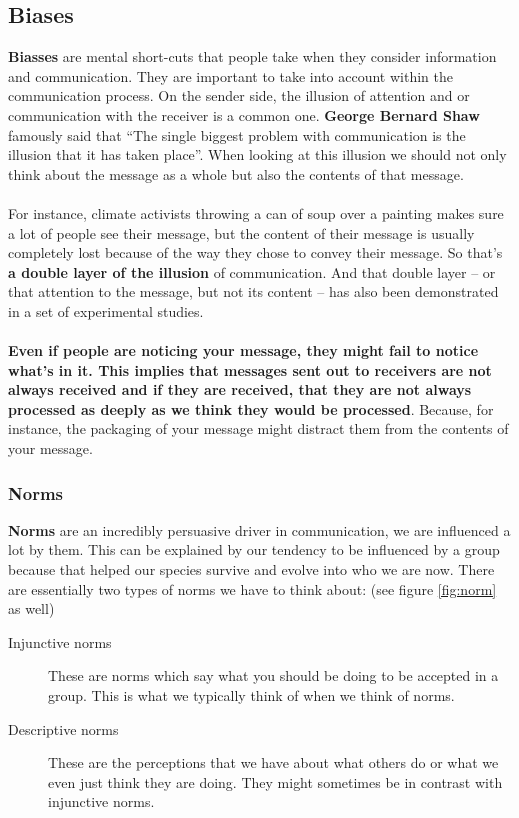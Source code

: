 \documentclass[../summary.tex]{subfiles}
\begin{document}
\subsection{Biases}
\textbf{Biasses} are mental short-cuts that people take when they consider information and communication. They are important to take into account within the communication process. On the sender side, the illusion of attention and or communication with the receiver is a common one. \textbf{George Bernard Shaw} famously said that ``The single biggest problem with communication is the illusion that it has taken place''. When looking at this illusion we should not only think about the message as a whole but also the contents of that message.
\\\\
For instance, climate activists throwing a can of soup over a painting makes sure a lot of people see their message, but the content of their message is usually completely lost because of the way they chose to convey their message. So that's \textbf{a double layer of the illusion} of communication. And that double layer -- or that attention to the message, but not its content -- has also been demonstrated in a set of experimental studies.
\\\\
\textbf{Even if people are noticing your message, they might fail to notice what's in it. This implies that messages sent out to receivers are not always received and if they are received, that they are not always processed as deeply as we think they would be processed}. Because, for instance, the packaging of your message might distract them from the contents of your message.

\newpage

\subsubsection{Norms}
\textbf{Norms} are an incredibly persuasive driver in communication, we are influenced a lot by them. This can be explained by our tendency to be influenced by a group because that helped our species survive and evolve into who we are now. There are essentially two types of norms we have to think about: (see figure \ref{fig:norm} as well)
\begin{description}
	\item[Injunctive norms] These are norms which say what you should be doing to be accepted in a group. This is what we typically think of when we think of norms.
	\item[Descriptive norms] These are the perceptions that we have about what others do or what we even just think they are doing. They might sometimes be in contrast with injunctive norms.
\end{description}
\end{document}
